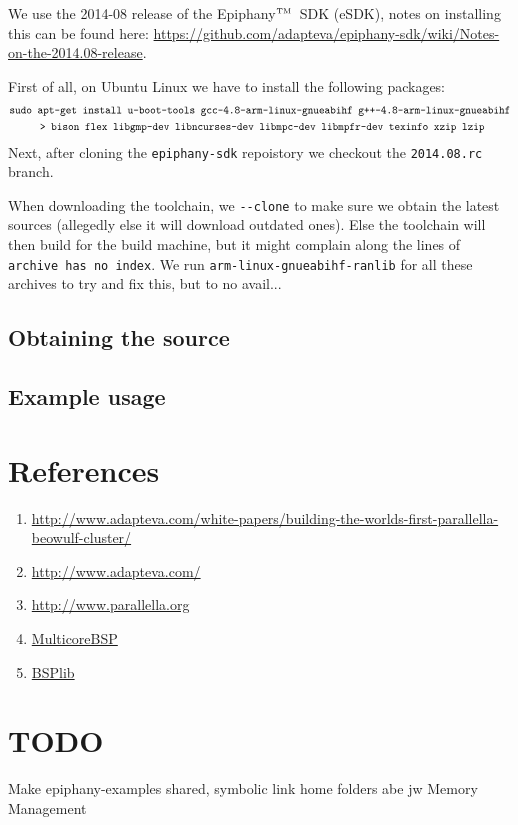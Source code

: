 \documentclass[fleqn]{article}
\renewcommand{\(}{\left(}
\renewcommand{\)}{\right)}
\def\tm{$^{\hbox{\tiny TM}}$~}
\begin{document}
We use the 2014-08 release of the Epiphany\tm SDK (eSDK), notes on installing this can be found here: \url{https://github.com/adapteva/epiphany-sdk/wiki/Notes-on-the-2014.08-release}.

First of all, on Ubuntu Linux we have to install the following packages:
\begin{align*} 
    &\texttt{sudo apt-get install u-boot-tools gcc-4.8-arm-linux-gnueabihf g++-4.8-arm-linux-gnueabihf} \\
    &\texttt{\hspace{1 cm}> bison flex libgmp-dev libncurses-dev libmpc-dev libmpfr-dev texinfo xzip lzip}
\end{align*}
Next, after cloning the \verb+epiphany-sdk+ repoistory we checkout the \texttt{2014.08.rc} branch.

When downloading the toolchain, we \verb+--clone+ to make sure we obtain the latest sources (allegedly else it will download outdated ones). Else the toolchain will then build for the build machine, but it might complain along the lines of \texttt{archive has no index}. We run \texttt{arm-linux-gnueabihf-ranlib} for all these archives to try and fix this, but to no avail...


\subsection{Obtaining the source}

\subsection{Example usage}

\section{References}

\begin{enumerate}
    \item \url{http://www.adapteva.com/white-papers/building-the-worlds-first-parallella-beowulf-cluster/}
    \item \url{http://www.adapteva.com/}
    \item \url{http://www.parallella.org}
    \item \url{MulticoreBSP}
    \item \url{BSPlib}
\end{enumerate}

\section{TODO}

Make epiphany-examples shared, symbolic link home folders abe jw
Memory Management
\end{document}
